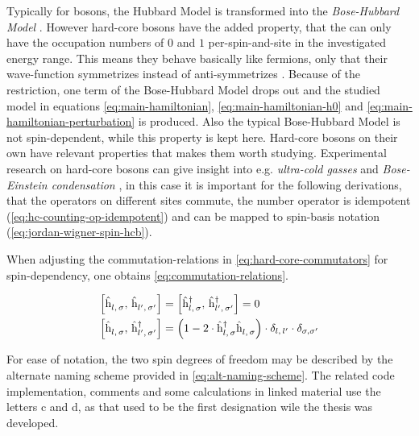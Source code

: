 Typically for bosons, the Hubbard Model is transformed into the \emph{Bose-Hubbard Model} \cite{boseHubbardModelOriginalDerivation}.
However hard-core bosons have the added property, that the can only have the occupation numbers of $0$ and $1$ per-spin-and-site in the investigated energy range.
This means they behave basically like fermions, only that their wave-function symmetrizes instead of anti-symmetrizes \cite{schwablBook}.
Because of the restriction, one term of the Bose-Hubbard Model drops out and the studied model in equations \ref{eq:main-hamiltonian}, \ref{eq:main-hamiltonian-h0} and \ref{eq:main-hamiltonian-perturbation} is produced.
Also the typical Bose-Hubbard Model is not spin-dependent, while this property is kept here.
Hard-core bosons on their own have relevant properties that makes them worth studying. 
Experimental research on hard-core bosons can give insight into e.g. \emph{ultra-cold gasses} and \emph{Bose-Einstein condensation} \cite{hardCoreBosonsBasics}, in this case it is important for the following derivations, that the operators on different sites commute, the number operator is idempotent (\ref{eq:hc-counting-op-idempotent}) and can be mapped to spin-basis notation (\ref{eq:jordan-wigner-spin-hcb}).

When adjusting the commutation-relations in \autoref{eq:hard-core-commutators} for spin-dependency, one obtains \autoref{eq:commutation-relations}.

\begin{equation}
    \label{eq:commutation-relations}
    \begin{split}
        \left[\withspinhcop[]{l}{\sigma}{},\,\withspinhcop[]{l'}{\sigma'}{}\right] &= 
        \left[\withspinhcop[]{l}{\sigma}{\dagger},\,\withspinhcop[]{l'}{\sigma'}{\dagger}\right] = 0\\
        \left[\withspinhcop[]{l}{\sigma}{},\,\withspinhcop[]{l'}{\sigma'}{\dagger}\right] &= 
        \left(1 - 2 \cdot \withspinhcop[]{l}{\sigma}{\dagger}\withspinhcop[]{l}{\sigma}{} \right) \cdot \delta_{l,\,l'}\cdot\delta_{\sigma,\sigma'}
    \end{split}
\end{equation}

For ease of notation, the two spin degrees of freedom may be described by the alternate naming scheme provided in \autoref{eq:alt-naming-scheme}.
The related code implementation, comments and some calculations in linked material \cite{selfCode} use the letters c and d, as that used to be the first designation wile the thesis was developed.

